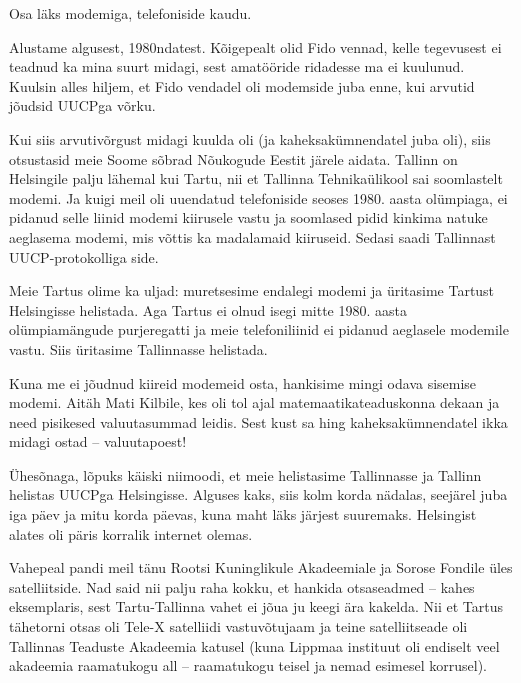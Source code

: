 
Osa läks modemiga, telefoniside kaudu. 


Alustame algusest, 1980ndatest. Kõigepealt 
olid Fido vennad, kelle tegevusest ei teadnud ka mina 
suurt midagi, sest amatööride ridadesse ma ei kuulunud. Kuulsin 
alles hiljem, et Fido vendadel oli modemside juba enne, kui arvutid jõudsid UUCPga 
võrku. 

Kui siis arvutivõrgust midagi kuulda oli (ja kaheksakümnendatel juba
oli), siis otsustasid meie Soome sõbrad Nõukogude Eestit järele 
aidata. Tallinn on Helsingile palju lähemal kui Tartu, nii et Tallinna 
Tehnikaülikool sai soomlastelt modemi. Ja 
kuigi meil oli uuendatud telefoniside seoses 1980. aasta olümpiaga, ei pidanud 
selle liinid modemi kiirusele vastu ja soomlased pidid kinkima natuke 
aeglasema modemi, mis võttis ka madalamaid kiiruseid. Sedasi saadi Tallinnast 
UUCP-protokolliga side. 

Meie Tartus olime ka uljad: muretsesime 
endalegi modemi ja üritasime Tartust Helsingisse helistada. Aga Tartus ei 
olnud isegi mitte 1980. aasta olümpiamängude purjeregatti ja meie telefoniliinid 
ei pidanud aeglasele modemile vastu. Siis üritasime 
Tallinnasse helistada. 

Kuna me ei jõudnud kiireid modemeid osta, hankisime
mingi odava sisemise modemi. Aitäh Mati Kilbile, kes oli tol ajal matemaatikateaduskonna dekaan ja need pisikesed valuutasummad 
leidis. Sest kust sa hing kaheksakümnendatel ikka midagi ostad -- valuutapoest! 

Ühesõnaga, lõpuks käiski niimoodi, et meie helistasime Tallinnasse ja Tallinn helistas UUCPga 
Helsingisse. Alguses kaks, siis kolm korda nädalas, seejärel juba 
iga päev ja mitu korda päevas, kuna maht läks järjest 
suuremaks. Helsingist alates oli päris korralik internet olemas. 


Vahepeal pandi meil tänu Rootsi Kuninglikule Akadeemiale ja 
Sorose Fondile üles satelliitside. Nad said nii palju raha 
kokku, et hankida otsaseadmed -- kahes eksemplaris, sest Tartu-Tallinna vahet ei 
jõua ju keegi ära kakelda. Nii et Tartus tähetorni otsas oli 
Tele-X satelliidi vastuvõtujaam ja teine satelliitseade oli Tallinnas Teaduste Akadeemia katusel (kuna Lippmaa 
instituut oli endiselt veel 
akadeemia raamatukogu all -- raamatukogu teisel ja nemad 
esimesel korrusel). 


